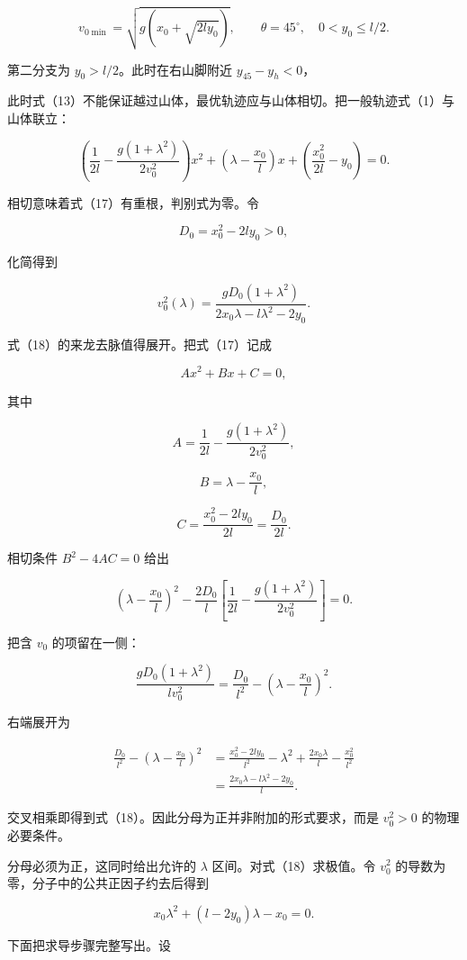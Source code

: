 \documentclass[12pt,a4paper,UTF8]{ctexart}
\begin{document}
\[\boxed{v_{0\min}=\sqrt{g(x_0+\sqrt{2ly_0})},\qquad\theta=45^\circ,\quad0<y_0\le l/2.} \tag{15}\]

第二分支为 \(y_0>l/2\)。此时在右山脚附近 \(y_{45}-y_h<0\)，

此时式（13）不能保证越过山体，最优轨迹应与山体相切。把一般轨迹式（1）与山体联立：

\[\left(\frac1{2l}-\frac{g(1+\lambda^2)}{2v_0^2}\right)x^2
+\left(\lambda-\frac{x_0}{l}\right)x
+\left(\frac{x_0^2}{2l}-y_0\right)=0. \tag{17}\]

相切意味着式（17）有重根，判别式为零。令

\[D_0=x_0^2-2ly_0>0,\]

化简得到

\[v_0^2(\lambda)
=\frac{gD_0(1+\lambda^2)}
{2x_0\lambda-l\lambda^2-2y_0}. \tag{18}\]

式（18）的来龙去脉值得展开。把式（17）记成

\[Ax^2+Bx+C=0,\]

其中

\[A=\frac1{2l}-\frac{g(1+\lambda^2)}{2v_0^2},\]

\[B=\lambda-\frac{x_0}{l},\]

\[C=\frac{x_0^2-2ly_0}{2l}=\frac{D_0}{2l}.\]

相切条件 \(B^2-4AC=0\) 给出

\[\left(\lambda-\frac{x_0}{l}\right)^2
-\frac{2D_0}{l}\left[
\frac1{2l}-\frac{g(1+\lambda^2)}{2v_0^2}
\right]=0.\]

把含 \(v_0\) 的项留在一侧：

\[\frac{gD_0(1+\lambda^2)}{lv_0^2}
=\frac{D_0}{l^2}-\left(\lambda-\frac{x_0}{l}\right)^2.\]

右端展开为

\[\begin{aligned}
\frac{D_0}{l^2}-\left(\lambda-\frac{x_0}{l}\right)^2
&=\frac{x_0^2-2ly_0}{l^2}
-\lambda^2+\frac{2x_0\lambda}{l}-\frac{x_0^2}{l^2}\\
&=\frac{2x_0\lambda-l\lambda^2-2y_0}{l}.
\end{aligned}\]

交叉相乘即得到式（18）。因此分母为正并非附加的形式要求，而是 \(v_0^2>0\)
的物理必要条件。

分母必须为正，这同时给出允许的 \(\lambda\) 区间。对式（18）求极值。令
\(v_0^2\) 的导数为零，分子中的公共正因子约去后得到

\[x_0\lambda^2+(l-2y_0)\lambda-x_0=0. \tag{19}\]

下面把求导步骤完整写出。设
\end{document}
